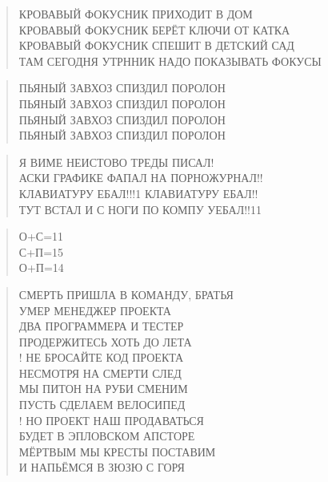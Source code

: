 \poemtitle{***}
\begin{verse}
КРОВАВЫЙ ФОКУСНИК ПРИХОДИТ В ДОМ\\
КРОВАВЫЙ ФОКУСНИК БЕРЁТ КЛЮЧИ ОТ КАТКА\\
КРОВАВЫЙ ФОКУСНИК СПЕШИТ В ДЕТСКИЙ САД\\
ТАМ СЕГОДНЯ УТРННИК НАДО ПОКАЗЫВАТЬ ФОКУСЫ
\end{verse}

\poemtitle{***}
\begin{verse}
ПЬЯНЫЙ ЗАВХОЗ СПИЗДИЛ ПОРОЛОН\\
ПЬЯНЫЙ ЗАВХОЗ СПИЗДИЛ ПОРОЛОН\\
ПЬЯНЫЙ ЗАВХОЗ СПИЗДИЛ ПОРОЛОН\\
ПЬЯНЫЙ ЗАВХОЗ СПИЗДИЛ ПОРОЛОН
\end{verse}

\poemtitle{***}
\begin{verse}
Я ВИМЕ НЕИСТОВО ТРЕДЫ ПИСАЛ!\\
АСКИ ГРАФИКЕ ФАПАЛ НА ПОРНОЖУРНАЛ!!\\
КЛАВИАТУРУ ЕБАЛ!!!1 КЛАВИАТУРУ ЕБАЛ!!\\
ТУТ ВСТАЛ И С НОГИ ПО КОМПУ УЕБАЛ!!11
\end{verse}

\poemtitle{***}
\begin{verse}
О+С=11\\
С+П=15\\
О+П=14
\end{verse}

\poemtitle{***}
\begin{verse}
СМЕРТЬ ПРИШЛА В КОМАНДУ, БРАТЬЯ\\
УМЕР МЕНЕДЖЕР ПРОЕКТА\\
ДВА ПРОГРАММЕРА И ТЕСТЕР\\
ПРОДЕРЖИТЕСЬ ХОТЬ ДО ЛЕТА\\!
НЕ БРОСАЙТЕ КОД ПРОЕКТА\\
НЕСМОТРЯ НА СМЕРТИ СЛЕД\\
МЫ ПИТОН НА РУБИ СМЕНИМ\\
ПУСТЬ СДЕЛАЕМ ВЕЛОСИПЕД\\!
НО ПРОЕКТ НАШ ПРОДАВАТЬСЯ\\
БУДЕТ В ЭПЛОВСКОМ АПСТОРЕ\\
МЁРТВЫМ МЫ КРЕСТЫ ПОСТАВИМ\\
И НАПЬЁМСЯ В ЗЮЗЮ С ГОРЯ
\end{verse}

